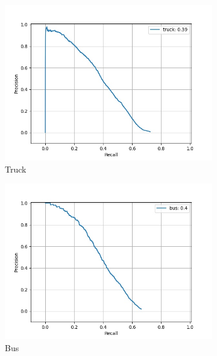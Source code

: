     \begin{figure}[ht] \ContinuedFloat
        
    	\begin{subfigure}[t]{0.325\textwidth}
    		\centering
    		\includegraphics[width=\textwidth]{images/sub_ens_pr/class_truck_pr.jpg}
    		\caption{Truck}
    	\end{subfigure}
    	\begin{subfigure}[t]{0.325\textwidth}
    		\centering
    		\includegraphics[width=\textwidth]{images/sub_ens_pr/class_bus_pr.jpg}
    		\caption{Bus}
    	\end{subfigure}
    	\begin{subfigure}[t]{0.325\textwidth}

\end{subfigure}
\end{figure}
